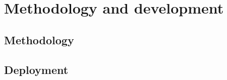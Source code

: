 \chapter{Methodology and development}
\label{cha:chapter3}


\section{Methodology}


\section{Deployment}


